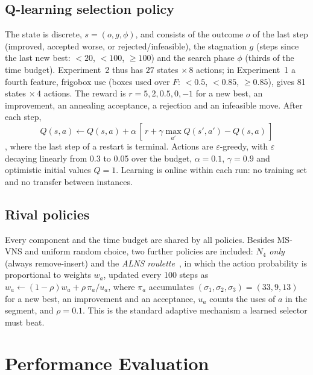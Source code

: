 \documentclass[conference]{IEEEtran}
\begin{document}
\subsection{Q-learning selection policy}
The state is discrete, $s=(o,g,\phi)$, and consists of the outcome $o$ of the last step (improved, accepted worse, or rejected/infeasible), the stagnation $g$ (steps since the last new best: $<20$, $<100$, $\ge 100$) and the search phase $\phi$ (thirds of the time budget). Experiment~2 thus has $27$ states $\times\,8$ actions; in Experiment~1 a fourth feature, frigobox use (boxes used over $F$: $<0.5$, $<0.85$, $\ge 0.85$), gives 81 states $\times\,4$ actions. The reward is $r=5,2,0.5,0,-1$ for a new best, an improvement, an annealing acceptance, a rejection and an infeasible move. After each step,
\begin{equation}
Q(s,a)\leftarrow Q(s,a)+\alpha\,[\,r+\gamma\max_{a'}Q(s',a')-Q(s,a)\,]
\end{equation}
\cite{watkins1992}, where the last step of a restart is terminal. Actions are $\varepsilon$-greedy, with $\varepsilon$ decaying linearly from 0.3 to 0.05 over the budget, $\alpha=0.1$, $\gamma=0.9$ and optimistic initial values $Q=1$. Learning is online within each run: no training set and no transfer between instances.

\subsection{Rival policies}
Every component and the time budget are shared by all policies. Besides MS-VNS and uniform random choice, two further policies are included: \emph{$N_4$ only} (always remove-insert) and the \emph{ALNS roulette}~\cite{ropke2006}, in which the action probability is proportional to weights $w_a$, updated every 100 steps as $w_a\leftarrow(1-\rho)w_a+\rho\,\pi_a/u_a$, where $\pi_a$ accumulates $(\sigma_1,\sigma_2,\sigma_3)=(33,9,13)$ for a new best, an improvement and an acceptance, $u_a$ counts the uses of $a$ in the segment, and $\rho=0.1$. This is the standard adaptive mechanism a learned selector must beat.

\section{Performance Evaluation}
\end{document}
